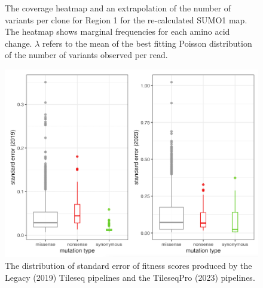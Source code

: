 \documentclass{article}
\begin{document}
\begin{figure}[H]%
    \centering
    \qquad
    \caption{The coverage heatmap and an extrapolation of the number of variants per clone for Region 1 for the re-calculated SUMO1 map. The heatmap shows marginal frequencies for each amino acid change. $\lambda$ refers to the mean of the best fitting Poisson distribution of the number of variants observed per read.}%
    \label{fig:heatmap}%
\end{figure}

\begin{figure}[H]
    \centering
    \includegraphics[width =.8\textwidth]{Figures/SUMO1/standard_error.png}
    \caption{The distribution of standard error of fitness scores produced by the Legacy (2019) Tileseq pipelines and the TileseqPro (2023) pipelines.}
    \label{fig:se boxplot}
\end{figure}
\end{document}
